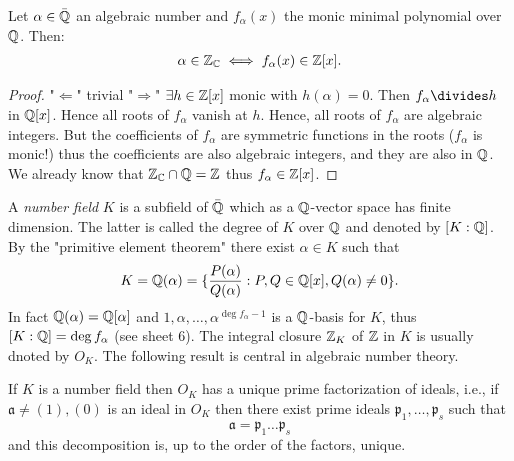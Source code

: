 \documentclass[NumTh.tex]{subfiles}
\begin{document}
\begin{lemma}[3.3.5\label{l_3_3_5}]
  Let $\alpha \in \bar{\mathbb{Q}}$ an algebraic number and $f_\alpha(x)$ the monic minimal polynomial over $\mathbb{Q}$.
  Then:
  \begin{align*}
    \alpha \in \mathbb{Z}_{\mathbb{C}} \iff f_\alpha(x) \in \mathbb{Z}[x] \text{.}
  \end{align*}
\end{lemma}

\begin{proof}
  "$\Leftarrow$" trivial
  "$\Rightarrow$" $\exists h \in \mathbb{Z}[x]$ monic with $h(\alpha) = 0$.
  Then $f_\alpha \divides h$ in $\mathbb{Q}[x]$.
  Hence all roots of $f_\alpha$ vanish at $h$.
  Hence, all roots of $f_\alpha$ are algebraic integers.
  But the coefficients of $f_\alpha$ are symmetric functions in the roots ($f_\alpha$ is monic!) thus the coefficients are also algebraic integers,
  and they are also in $\mathbb{Q}$.
  We already know that $\mathbb{Z}_{\mathbb{C}} \cap \mathbb{Q} = \mathbb{Z}$ thus $f_\alpha \in \mathbb{Z}[x]$.
\end{proof}

A \emph{number field} $K$ is a subfield of $\bar{\mathbb{Q}}$ which as a $\mathbb{Q}$-vector space has finite dimension.
The latter is called the degree of $K$ over $\mathbb{Q}$ and denoted by $[K:\mathbb{Q}]$.
By the "primitive element theorem" there exist $\alpha \in K$ such that 
\[ K = \mathbb{Q}(\alpha) = \{ \frac{P(\alpha)}{Q(\alpha)} : P,Q \in \mathbb{Q}[x], Q(\alpha) \neq 0 \} \text{.} \]
In fact $\mathbb{Q}(\alpha) = \mathbb{Q}[\alpha]$ and $1,\alpha,\dots,\alpha^{\deg f_\alpha - 1}$ is a $\mathbb{Q}$-basis for $K$,
thus $[K:\mathbb{Q}] = \deg f_\alpha$ (see sheet 6).
The integral closure $\mathbb{Z}_K$ of $\mathbb{Z}$ in $K$ is usually dnoted by $O_K$.
The following result is central in algebraic number theory.

\begin{theorem}[3.3.6\label{th_3_3_6}]
  If $K$ is a number field then $O_K$ has a unique prime factorization of ideals,
  i.e., if $\mathfrak{a} \neq (1),(0)$ is an ideal in $O_K$ then there exist prime ideals $\mathfrak{p}_1,\dots,\mathfrak{p}_s$ such that
  \[ \mathfrak{a} = \mathfrak{p}_1 \dots \mathfrak{p}_s \]
  and this decomposition is, up to the order of the factors, unique.
\end{theorem}
\end{document}
